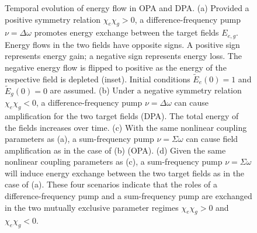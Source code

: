 \documentclass[aps,prl,nobibnotes,nofootinbib,showpacs,reprint]{revtex4-1}
\newcommand{\chie}{\chi_{e}}
\newcommand{\chig}{\chi_{g}}
\newcommand{\Dw}{\Delta \omega}
\newcommand{\Sw}{\Sigma \omega}
\begin{document}
\begin{figure}[t]
\centering
{}
\caption{Temporal evolution of energy flow in OPA and DPA. (a) Provided a positive symmetry relation $\chie\chig > 0$, a difference-frequency pump $\nu = \Dw$ promotes energy exchange between the target fields $E_{e,g}$. Energy flows in the two fields have opposite signs. A positive sign represents energy gain; a negative sign represents energy loss. The negative energy flow is flipped to positive as the energy of the respective field is depleted (inset). Initial conditions $\tilde{E}_{e}(0) = 1$ and $\tilde{E}_{g}(0) = 0$ are assumed. (b) Under a negative symmetry relation $\chie\chig < 0$, a difference-frequency pump $\nu = \Dw$ can cause amplification for the two target fields (DPA). The total energy of the fields increases over time. (c) With the same nonlinear coupling parameters as (a), a sum-frequency pump $\nu = \Sw$ can cause field amplification as in the case of (b) (OPA). (d) Given the same nonlinear coupling parameters as (c), a sum-frequency pump $\nu = \Sw$ will induce energy exchange between the two target fields as in the case of (a). These four scenarios indicate that the roles of a difference-frequency pump and a sum-frequency pump are exchanged in the two mutually exclusive parameter regimes $\chie\chig > 0$ and $\chie\chig < 0$.}
\label{fig:work_traj}
\end{figure}
\end{document}
